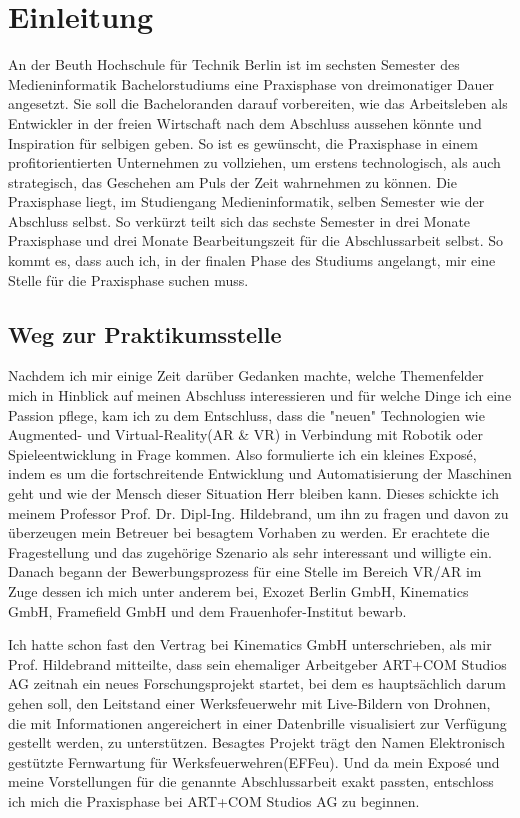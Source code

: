\documentclass[a4paper,12pt]{scrartcl}
\begin{document}
\section{Einleitung}
An der Beuth Hochschule für Technik Berlin ist im sechsten Semester des Medieninformatik Bachelorstudiums eine Praxisphase von dreimonatiger Dauer angesetzt. Sie soll die Bacheloranden darauf vorbereiten, wie das Arbeitsleben als Entwickler in der freien Wirtschaft nach dem Abschluss aussehen könnte und Inspiration für selbigen geben. So ist es gewünscht, die Praxisphase in einem profitorientierten Unternehmen zu vollziehen, um erstens technologisch, als auch strategisch, das Geschehen am Puls der Zeit wahrnehmen zu können. Die Praxisphase liegt, im Studiengang Medieninformatik, selben Semester wie der Abschluss selbst. So verkürzt teilt sich das sechste Semester in drei Monate Praxisphase und drei Monate Bearbeitungszeit für die Abschlussarbeit selbst. So kommt es, dass auch ich, in der finalen Phase des Studiums angelangt, mir eine Stelle für die Praxisphase suchen muss.

\subsection{Weg zur Praktikumsstelle}
Nachdem ich mir einige Zeit darüber Gedanken machte, welche Themenfelder mich in Hinblick auf meinen Abschluss interessieren und für welche Dinge ich eine Passion pflege, kam ich zu dem Entschluss, dass die "neuen" Technologien wie Augmented- und Virtual-Reality(AR \& VR) in Verbindung mit Robotik oder Spieleentwicklung in Frage kommen. Also formulierte ich ein kleines Exposé, indem es um die fortschreitende Entwicklung und Automatisierung der Maschinen geht und wie der Mensch dieser Situation Herr bleiben kann. Dieses schickte ich meinem Professor Prof. Dr. Dipl-Ing. Hildebrand, um ihn zu fragen und davon zu überzeugen mein Betreuer bei besagtem Vorhaben zu werden. Er erachtete die Fragestellung und das zugehörige Szenario als sehr interessant und willigte ein.
\newline
\newline
Danach begann der Bewerbungsprozess für eine Stelle im Bereich VR/AR im Zuge dessen ich mich unter anderem bei, Exozet Berlin GmbH, Kinematics GmbH, Framefield GmbH und dem Frauenhofer-Institut bewarb.


Ich hatte schon fast den Vertrag bei Kinematics GmbH unterschrieben, als mir Prof. Hildebrand mitteilte, dass sein ehemaliger Arbeitgeber ART+COM Studios AG zeitnah ein neues Forschungsprojekt startet, bei dem es hauptsächlich darum gehen soll, den Leitstand einer Werksfeuerwehr mit Live-Bildern von Drohnen, die mit Informationen angereichert in einer Datenbrille visualisiert zur Verfügung gestellt werden, zu unterstützen.
\newline
\newline
Besagtes Projekt trägt den Namen Elektronisch gestützte Fernwartung für Werksfeuerwehren(EFFeu). Und da mein Exposé und meine Vorstellungen für die genannte Abschlussarbeit exakt passten, entschloss ich mich die Praxisphase bei ART+COM Studios AG zu beginnen.
\end{document}
